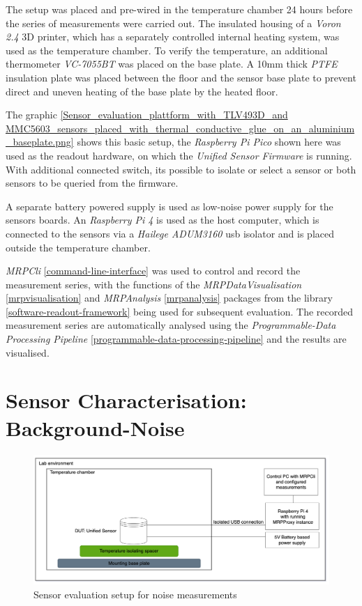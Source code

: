The setup was placed and pre-wired in the temperature chamber 24 hours
before the series of measurements were carried out. The insulated
housing of a \emph{Voron 2.4} 3D printer, which has a separately
controlled internal heating system, was used as the temperature chamber.
To verify the temperature, an additional thermometer \emph{VC-7055BT}
was placed on the base plate. A 10mm thick \emph{PTFE} insulation plate
was placed between the floor and the sensor base plate to prevent direct
and uneven heating of the base plate by the heated floor.

The graphic
\ref{Sensor_evaluation_plattform_with_TLV493D_and MMC5603_sensors_placed_with_thermal_conductive_glue_on_an_aluminium_baseplate.png}
shows this basic setup, the \emph{Raspberry Pi Pico} shown here was used
as the readout hardware, on which the \emph{Unified Sensor Firmware} is
running. With additional connected switch, its possible to isolate or
select a sensor or both sensors to be queried from the firmware.

A separate battery powered supply is used as low-noise power supply for
the sensors boards. An \emph{Raspberry Pi 4} is used as the host
computer, which is connected to the sensors via a \emph{Hailege
ADUM3160} \gls{usb} isolator and is placed outside the temperature
chamber.

\emph{MRPCli} \ref{command-line-interface} was used to control and
record the measurement series, with the functions of the
\emph{MRPDataVisualisation} \ref{mrpvisualisation} and
\emph{MRPAnalysis} \ref{mrpanalysis} packages from the library
\ref{software-readout-framework} being used for subsequent evaluation.
The recorded measurement series are automatically analysed using the
\emph{Programmable-Data Processing Pipeline}
\ref{programmable-data-processing-pipeline} and the results are
visualised.

\hypertarget{sensor-characterisation-background-noise}{%
\section{Sensor Characterisation:
Background-Noise}\label{sensor-characterisation-background-noise}}

\begin{figure}
\centering
\includegraphics{./generated_images/border_Sensor_evaluation_setup_for_noise_measurements.png}
\caption{Sensor evaluation setup for noise measurements
\label{Sensor_evaluation_setup_for_noise_measurements.png}}
\end{figure}

